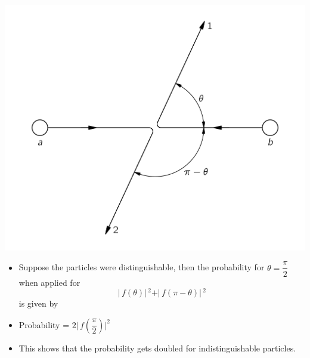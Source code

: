 \documentclass[aspectratio=169]{beamer}
\begin{document}
\begin{frame}{}

	\begin{multicols}{2}
 
   		\includegraphics[scale=0.45]{a-b.png}

	\columnbreak
	
		\begin{itemize}

			\item Suppose the particles were distinguishable, then the probability for $\theta = \dfrac{\pi}{2}$ when applied for \[ \rvert\,f(\theta) \rvert\,^{2} + \rvert\,f(\pi - \theta) \rvert\,^{2} \] is given by \pause \newline
			\item Probability = $2 \Bigr\rvert\, f\left(\dfrac{\pi}{2}\right) \Bigr\rvert ^{2}$ \pause \newline 
			\item This shows that the probability gets doubled for indistinguishable particles.

		\end{itemize}
	
	\end{multicols}

	
\end{frame}
\end{document}
